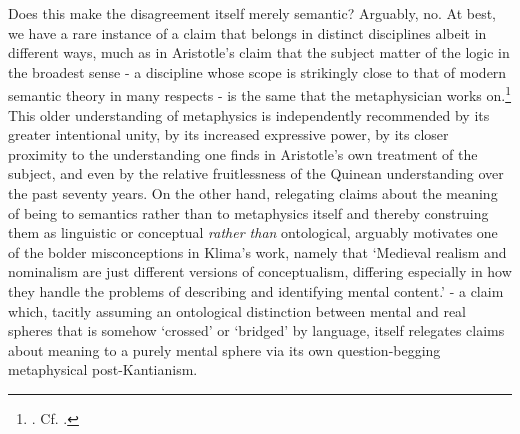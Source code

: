 \documentclass[]{article}
\begin{document}
Does this make the disagreement itself merely semantic? 
Arguably, no. 
At best, we have a rare instance of a claim that belongs in distinct disciplines albeit in different ways, 
much as in Aristotle's claim that the subject matter of the logic in the broadest sense - 
a discipline whose scope is strikingly close to that of modern semantic theory in many respects - 
is the same that the metaphysician works on.\footnote{\autocite[1004b 22-23]{Metaph}. Cf. \autocite[q. 3]{ScotusIsagoge}.}
This older understanding of metaphysics is independently recommended 
by its greater intentional unity, 
by its increased expressive power, 
by its closer proximity to the understanding one finds in Aristotle's own treatment of the subject, 
and even by the relative fruitlessness of the Quinean understanding over the past seventy years.
On the other hand, 
relegating claims about the meaning of being to semantics 
rather than to metaphysics itself 
and thereby construing them as linguistic or conceptual \emph{rather than} ontological, 
arguably motivates one of the bolder misconceptions in Klima's work, 
namely that 
`Medieval realism and nominalism are just different versions of conceptualism, differing especially in how they handle the problems of
describing and identifying mental content.'\autocite[110]{Klima2011} 
- a claim which, 
tacitly assuming an ontological distinction between mental and real spheres that is somehow `crossed' or `bridged' by language, 
itself relegates claims about meaning to a purely mental sphere via its own question-begging metaphysical post-Kantianism.
\end{document}
